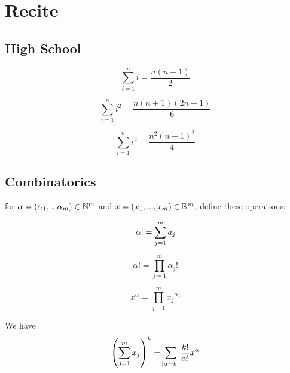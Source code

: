 \chapter{Recite}


\section{High School}

\begin{multicols}{3}
    \begin{equation*}
        \sum_{i=1}^n i = \frac{n (n+1)}{2}
    \end{equation*}
    \columnbreak

    \begin{equation*}
        \sum_{i=1}^n i^2 = \frac{n (n+1) (2n+1)}{6}
    \end{equation*}
    \columnbreak

    \begin{equation*}
        \sum_{i=1}^n i^3 = \frac{n^2 (n+1)^2}{4}
    \end{equation*}
    \columnbreak

\end{multicols}



\section{Combinatorics}


\begin{theorem}
    for $\alpha=(\alpha_1, ... \alpha_m) \in \mathbb{N}^m$ and $x=(x_1, ..., x_m) \in \mathbb{R}^m$, define these operations:
    
    \begin{multicols}{3}
        \begin{equation*}
            \abs{\alpha} = \sum_{j=1}^m a_j
        \end{equation*}
        \columnbreak
        
        \begin{equation*}
            \alpha ! = \prod_{j=1}^m \alpha_j !
        \end{equation*}
        \columnbreak
        
        \begin{equation*}
            x^\alpha = \prod_{j=1}^m {x_j}^{\alpha_j}
        \end{equation*}
        \columnbreak
    \end{multicols}
    
    We have
    \begin{equation}
        \left(\sum_{j=1}^m x_j \right)^k = \sum_{\abs{\alpha = k}} \frac{k!}{\alpha !} x^\alpha
    \end{equation}
\end{theorem}

